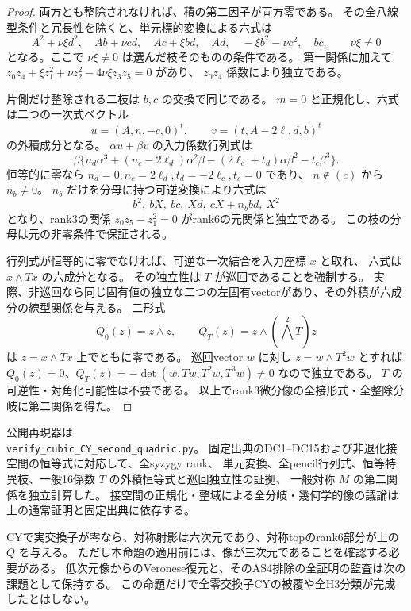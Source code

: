 \begin{proof}
両方とも整除されなければ、積の第二因子が両方零である。
その全八線型条件と冗長性を除くと、単元標的変換による六式は
\[
 A^2+\nu\xi d^2,\quad Ab+\nu cd,\quad Ac+\xi bd,\quad
 Ad,\quad-\xi b^2-\nu c^2,\quad bc,
 \qquad \nu\xi\ne0
\]
となる。ここで $\nu\xi\ne0$ は選んだ枝そのものの条件である。
第一関係に加えて
$z_0z_4+\xi z_1^2+\nu z_2^2-4\nu\xi z_3z_5=0$ があり、
$z_0z_4$ 係数により独立である。

片側だけ整除される二枝は $b,c$ の交換で同じである。
$m=0$ と正規化し、六式は二つの一次式ベクトル
\[
 u=(A,n,-c,0)^t,\qquad v=(t,A-2\ell,d,b)^t
\]
の外積成分となる。
$\alpha u+\beta v$ の入力係数行列式は
\[
 \beta\{n_d\alpha^3+(n_c-2\ell_d)\alpha^2\beta
 -(2\ell_c+t_d)\alpha\beta^2-t_c\beta^3\}.
\]
恒等的に零なら $n_d=0,n_c=2\ell_d,t_d=-2\ell_c,t_c=0$ であり、
$n\notin(c)$ から $n_b\ne0$。
$n_b$ だけを分母に持つ可逆変換により六式は
\[
 b^2,\ bX,\ bc,\ Xd,\ cX+n_bbd,\ X^2
\]
となり、rank3の関係 $z_0z_5-z_1^2=0$ がrank6の元関係と独立である。
この枝の分母は元の非零条件で保証される。

行列式が恒等的に零でなければ、可逆な一次結合を入力座標 $x$ と取れ、
六式は $x\wedge Tx$ の六成分となる。
その独立性は $T$ が巡回であることを強制する。
実際、非巡回なら同じ固有値の独立な二つの左固有vectorがあり、その外積が六成分の線型関係を与える。
二形式
\[
 Q_0(z)=z\wedge z,\qquad Q_T(z)=z\wedge(\bigwedge^2T)z
\]
は $z=x\wedge Tx$ 上でともに零である。
巡回vector $w$ に対し $z=w\wedge T^2w$ とすれば
$Q_0(z)=0$、$Q_T(z)=-\det(w,Tw,T^2w,T^3w)\ne0$ なので独立である。
$T$ の可逆性・対角化可能性は不要である。
以上でrank3微分像の全接形式・全整除分岐に第二関係を得た。
\end{proof}

公開再現器は\\
\texttt{verify\_cubic\_CY\_second\_quadric.py}。
固定出典のDC1--DC15および非退化接空間の恒等式に対応して、全syzygy rank、
単元変換、全pencil行列式、恒等特異枝、一般16係数 $T$ の外積恒等式と巡回独立性の証拠、
一般対称 $M$ の第二関係を独立計算した。
接空間の正規化・整域による全分岐・幾何学的像の議論は上の通常証明と固定出典に依存する。

CYで実交換子が零なら、対称射影は六次元であり、対称topのrank6部分が上の $Q$ を与える。
ただし本命題の適用前には、像が三次元であることを確認する必要がある。
低次元像からのVeronese復元と、そのAS4排除の全証明の監査は次の課題として保持する。
この命題だけで全零交換子CYの被覆や全H3分類が完成したとはしない。
